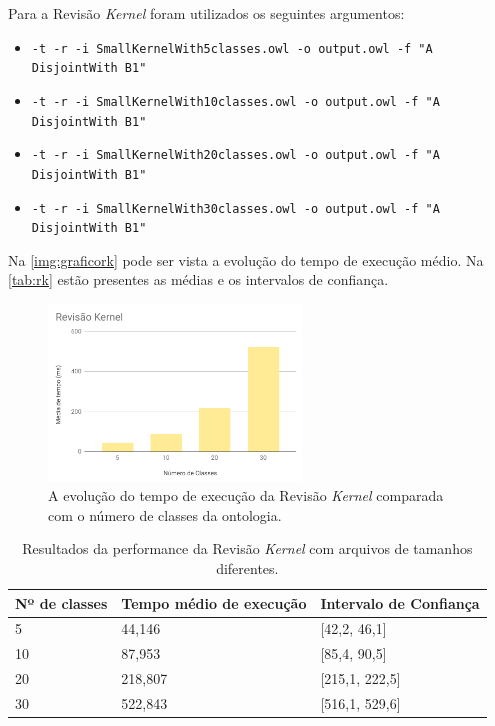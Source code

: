 Para a Revisão \textit{Kernel} foram utilizados os seguintes argumentos:

\begin{itemize}
	\item \texttt{-t -r -i SmallKernelWith5classes.owl -o output.owl -f "A DisjointWith B1"}
	\item \texttt{-t -r -i SmallKernelWith10classes.owl -o output.owl -f "A DisjointWith B1"}
	\item \texttt{-t -r -i SmallKernelWith20classes.owl -o output.owl -f "A DisjointWith B1"}
	\item \texttt{-t -r -i SmallKernelWith30classes.owl -o output.owl -f "A DisjointWith B1"}
\end{itemize}

Na \autoref{img:graficork} pode ser vista a evolução do tempo de execução médio. Na \autoref{tab:rk} estão presentes as médias e os intervalos de confiança.

\begin{figure}[H]
	\centering
	\includegraphics[width=0.6\textwidth]{Capitulos/Testes/graficork.png}
	\caption{A evolução do tempo de execução da Revisão \textit{Kernel} comparada com o número de classes da ontologia.}
	\label{img:graficork}
\end{figure}

\begin{table}[H]
	\centering
	\begin{tabular}{|l|l|l|}
		\hline
		\textbf{Nº de classes}  & \textbf{Tempo médio de execução} & \textbf{Intervalo de Confiança} \\ \hline
		5                                                  & 44,146                          & {[}42,2, 46,1{]}              \\ \hline
		10                                                  & 87,953                          & {[}85,4, 90,5{]}              \\ \hline
		20                                                  & 218,807                          & {[}215,1, 222,5{]}              \\ \hline
		30                                                 & 522,843                          & {[}516,1, 529,6{]}              \\ \hline
	\end{tabular}
	\caption{Resultados da performance da Revisão \textit{Kernel} com arquivos de tamanhos diferentes.}
	\label{tab:rk}
\end{table}

